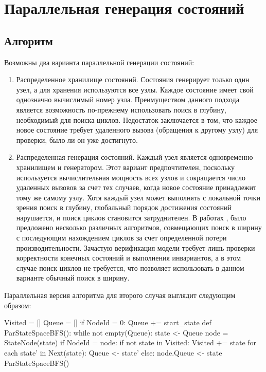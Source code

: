 \chapter{Параллельная генерация состояний}
\label{sec:par-statespace}

\section{Алгоритм}
\label{sec:par-algo}

Возможны два варианта параллельной генерации состояний:

\begin{enumerate}
\item Распределенное хранилище состояний. Состояния генерирует только один узел, а для
  хранения используются все узлы. Каждое состояние имеет свой однозначно вычислимый номер
  узла. Преимуществом данного подхода является возможность по-прежнему использовать поиск
  в глубину, необходимый для поиска циклов. Недостаток заключается в том, что каждое новое
  состояние требует удаленного вызова (обращения к другому узлу) для проверки, было ли он
  уже достигнуто.

\item Распределенная генерация состояний. Каждый узел является одновременно хранилищем и
  генератором. Этот вариант предпочтителен, поскольку используется вычислительная мощность
  всех узлов и сокращается число удаленных вызовов за счет тех случаев, когда новое
  состояние принадлежит тому же самому узлу. Хотя каждый узел может выполнять с локальной
  точки зрения поиск в глубину, глобальный порядок достижения состояний нарушается, и
  поиск циклов становится затруднителен. В работах \cite{DLTL1}, \cite{DLTL2} было
  предложено несколько различных алгоритмов, совмещающих поиск в ширину с последующим
  нахождением циклов за счет определенной потери производительности. Зачастую верификация
  модели требует лишь проверки корректности конечных состояний и выполнения инвариантов, а
  в этом случае поиск циклов не требуется, что позволяет использовать в данном варианте
  обычный поиск в ширину.
\end{enumerate}

Параллельная версия алгоритма для второго случая выглядит следующим образом:

\begin{CodeBlock}
Visited = []
Queue = []
if NodeId = 0:
    Queue += start_state
def ParStateSpaceBFS():
    while not empty(Queue):
        state <- Queue
        node = StateNode(state)
        if NodeId = node:
            if not state in Visited:
                Visited += state
                for each state' in Next(state):
                    Queue <- state'
        else:
            node.Queue <- state
ParStateSpaceBFS()
\end{CodeBlock}

